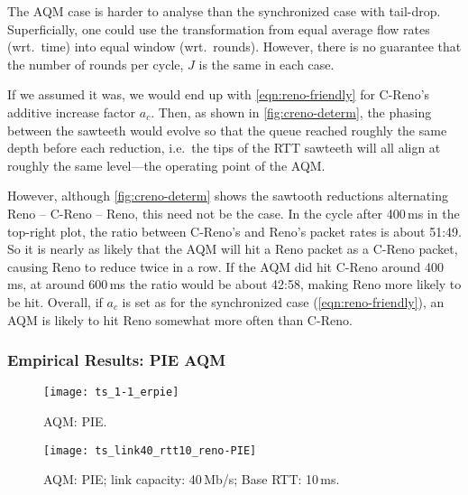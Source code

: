 The AQM case is harder to analyse than the synchronized case with tail-drop. Superficially, one could use the transformation from equal average flow rates (wrt.\ time) into equal window (wrt.\ rounds). However, there is no guarantee that the number of rounds per cycle, \(J\) is the same in each case.

If we assumed it was, we would end up with \autoref{eqn:reno-friendly} for C-Reno's additive increase factor \(a_c\). Then, as shown in \autoref{fig:creno-determ}, the phasing between the sawteeth would evolve so that the queue reached roughly the same depth before each reduction, i.e.\ the tips of the RTT sawteeth will all align at roughly the same level---the operating point of the AQM. 

However, although \autoref{fig:creno-determ} shows the sawtooth reductions alternating Reno -- C-Reno -- Reno, this need not be the case. In the cycle after 400\,ms in the top-right plot, the ratio between C-Reno's and Reno's packet rates is about 51:49. So it is nearly as likely that the AQM will hit a Reno packet as a C-Reno packet, causing Reno to reduce twice in a row. If the AQM did hit C-Reno around 400\,ms, at around 600\,ms the ratio would be about 42:58, making Reno more likely to be hit. Overall, if \(a_c\) is set as for the synchronized case (\autoref{eqn:reno-friendly}), an AQM is likely to hit Reno somewhat more often than C-Reno.

\subsubsection{Empirical Results: PIE AQM}
\begin{figure}
	\centering
	\texttt{[image: ts\_1-1\_erpie]}
	\caption{AQM: PIE.}\label{fig:ts_1-1_erpie}
\end{figure}

\begin{figure}
	\centering
	\texttt{[image: ts\_link40\_rtt10\_reno-PIE]}
	\caption{AQM: PIE; link capacity: 40\,Mb/s; Base RTT: 10\,ms.}\label{fig:creno-v-reno-PIE}
\end{figure}

